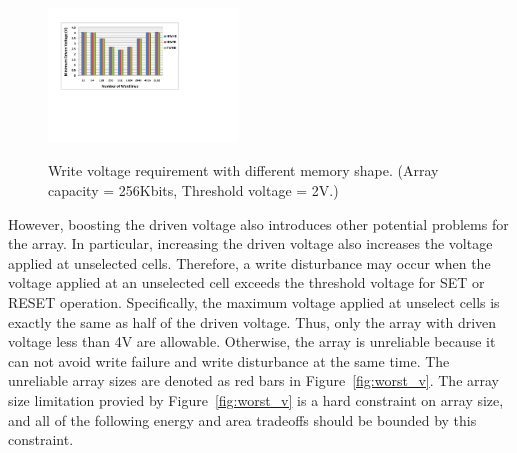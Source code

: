 \begin{figure}%
\centering
  \includegraphics[width=0.45\textwidth]{./figures/shape_f.pdf}\\
  \caption{Write voltage requirement with different memory shape. (Array capacity = 256Kbits, Threshold voltage = 2V.)}\label{fig:shape}
    \vspace{-15pt}
\end{figure}

However, boosting the driven voltage also introduces other potential
problems for the array. In particular, increasing the driven voltage also
increases the voltage applied at unselected cells. Therefore, a write
disturbance may occur when the voltage applied at an unselected cell
exceeds the threshold voltage for SET or RESET operation. Specifically,
the maximum voltage applied at unselect cells is exactly the same as half
of the driven voltage. Thus, only the array with driven voltage less than
4V are allowable.  Otherwise, the array is unreliable because it can not
avoid write failure and write disturbance at the same time. The unreliable
array sizes are denoted as red bars in Figure~\ref{fig:worst_v}. The array
size limitation provied by Figure~\ref{fig:worst_v} is a hard constraint
on array size, and all of the following energy and area tradeoffs should
be bounded by this constraint.





